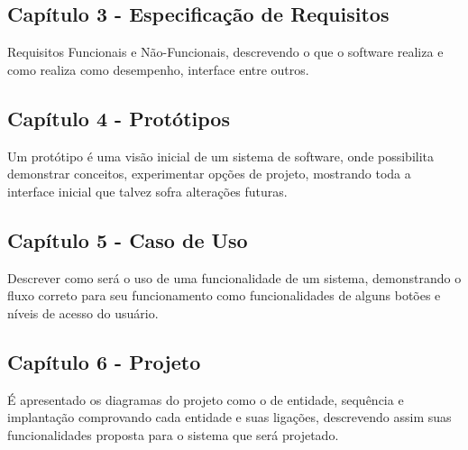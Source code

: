 \subsection{Capítulo 3 - Especificação de Requisitos}

Requisitos Funcionais e Não-Funcionais, descrevendo o que o software realiza e como realiza como desempenho, interface entre outros.

\subsection{Capítulo 4 - Protótipos}

Um protótipo é uma visão inicial de um sistema de software, onde possibilita demonstrar conceitos, experimentar opções de projeto, mostrando toda a interface inicial que talvez sofra alterações futuras.

\subsection{Capítulo 5 - Caso de Uso}

Descrever como será o uso de uma funcionalidade de um sistema, demonstrando o fluxo correto para seu funcionamento como funcionalidades de alguns botões e níveis de acesso do usuário.

\subsection{Capítulo 6 - Projeto}

É apresentado os diagramas do projeto como o de entidade, sequência e implantação comprovando cada entidade e suas ligações, descrevendo assim suas funcionalidades proposta para o sistema que será projetado.